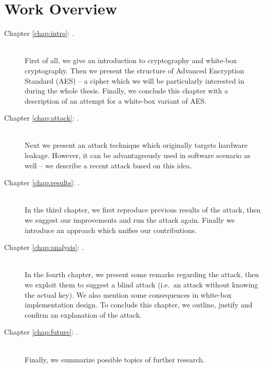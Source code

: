\section*{Work Overview}
	\begin{description}
		\item[Chapter \ref{chap:intro}: .] ~ \\
			First of all, we give an introduction to cryptography and white-box cryptography. Then we present the structure of Advanced Encryption Standard (AES) -- a cipher which we will be particularly interested in during the whole thesis. Finally, we conclude this chapter with a description of an attempt for a white-box variant of AES.
		\item[Chapter \ref{chap:attack}: .] ~ \\
			Next we present an attack technique which originally targets hardware leakage. However, it can be advantageously used in software scenario as well -- we describe a recent attack based on this idea.
		\item[Chapter \ref{chap:results}: .] ~ \\
			In the third chapter, we first reproduce previous results of the attack, then we suggest our improvements and run the attack again. Finally we introduce an approach which unifies our contributions.
		\item[Chapter \ref{chap:analysis}: .] ~ \\
			In the fourth chapter, we present some remarks regarding the attack, then we exploit them to suggest a blind attack (i.e.\ an attack without knowing the actual key). We also mention some consequences in white-box implementation design. To conclude this chapter, we outline, justify and confirm an explanation of the attack.
		\item[Chapter \ref{chap:future}: .] ~ \\
			Finally, we summarize possible topics of further research.
	\end{description}
